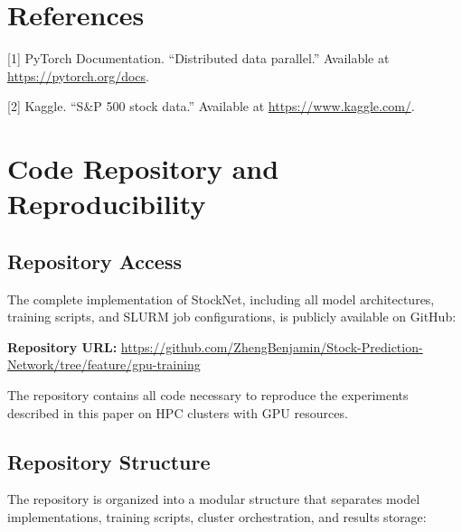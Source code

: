 \documentclass[sigconf]{acmart}
\begin{document}
\section{References}

[1] PyTorch Documentation. ``Distributed data parallel.'' 
Available at \url{https://pytorch.org/docs}.

[2] Kaggle. ``S\&P 500 stock data.'' 
Available at \url{https://www.kaggle.com/}.

\newpage
\appendix

\section{Code Repository and Reproducibility}

\subsection{Repository Access}

The complete implementation of StockNet, including all model architectures, training scripts, and SLURM job configurations, is publicly available on GitHub:

\textbf{Repository URL:} \url{https://github.com/ZhengBenjamin/Stock-Prediction-Network/tree/feature/gpu-training}

The repository contains all code necessary to reproduce the experiments described in this paper on HPC clusters with GPU resources.

\subsection{Repository Structure}

The repository is organized into a modular structure that separates model implementations, training scripts, cluster orchestration, and results storage:
\end{document}
